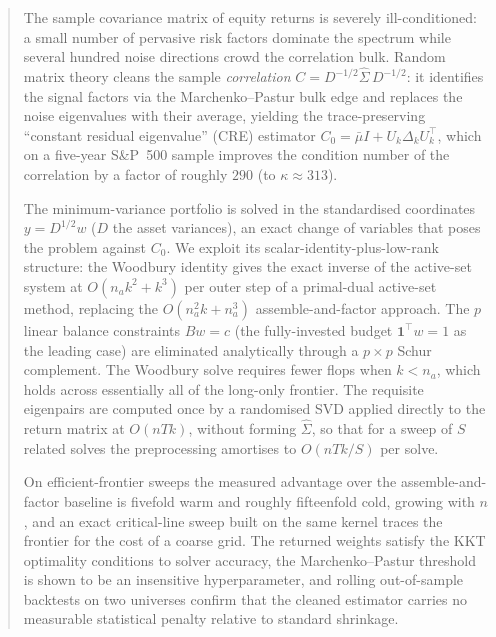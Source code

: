 \begin{abstract}
The sample covariance matrix of equity returns is severely ill-conditioned: a
small number of pervasive risk factors dominate the spectrum while several hundred
noise directions crowd the correlation bulk. Random matrix theory cleans the
sample \emph{correlation} $C = D^{-1/2}\hat\Sigma\,D^{-1/2}$: it identifies the
signal factors via the Marchenko--Pastur bulk edge and replaces the noise
eigenvalues with their average, yielding the trace-preserving ``constant residual
eigenvalue'' (CRE) estimator $C_0 = \bar\mu I + U_k\Delta_k U_k^\top$, which on a
five-year S\&P~500 sample improves the condition number of the correlation by a
factor of roughly $290$ (to $\kappa \approx 313$).

The minimum-variance portfolio is solved in the standardised coordinates
$y = D^{1/2}w$ ($D$ the asset variances), an exact change of variables that poses
the problem against $C_0$. We exploit its scalar-identity-plus-low-rank structure:
the Woodbury identity gives the exact inverse of the active-set system at
$O(n_a k^2 + k^3)$ per outer step of a primal-dual active-set method, replacing the
$O(n_a^2 k + n_a^3)$ assemble-and-factor approach. The $p$ linear balance
constraints $Bw=c$ (the fully-invested budget $\mathbf{1}^\top w = 1$ as the
leading case) are eliminated analytically through a $p \times p$ Schur complement.
The Woodbury solve requires fewer flops when $k < n_a$, which holds across
essentially all of the long-only frontier. The requisite eigenpairs are computed
once by a randomised SVD applied directly to the return matrix at $O(nTk)$, without
forming $\hat\Sigma$, so that for a sweep of $S$ related solves the preprocessing
amortises to $O(nTk/S)$ per solve.

On efficient-frontier sweeps the measured advantage over the assemble-and-factor
baseline is fivefold warm and roughly fifteenfold cold, growing with $n$, and an
exact critical-line sweep built on the same kernel traces the frontier for the cost
of a coarse grid. The returned weights satisfy the KKT optimality conditions to
solver accuracy, the Marchenko--Pastur threshold is shown to be an insensitive
hyperparameter, and rolling out-of-sample backtests on two universes confirm that
the cleaned estimator carries no measurable statistical penalty relative to
standard shrinkage.
\end{abstract}
